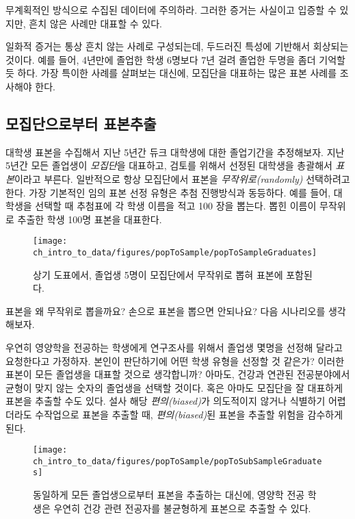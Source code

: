 \begin{termBox}{
무계획적인 방식으로 수집된 데이터에 주의하라. 그러한 증거는 사실이고 입증할 수 있지만, 흔치 않은 사례만 대표할 수 있다.}
\end{termBox}

일화적 증거는 통상 흔치 않는 사례로 구성되는데, 두드러진 특성에 기반해서 회상되는 것이다.
예를 들어, 4년만에 졸업한 학생 6명보다 7년 걸려 졸업한 두명을 좀더 기억할 듯 하다.
가장 특이한 사례를 살펴보는 대신에, 모집단을 대표하는 많은 표본 사례를 조사해야 한다.

\subsection{모집단으로부터 표본추출}


대학생 표본을 수집해서 지난 5년간 듀크 대학생에 대한 졸업기간을 추정해보자.
지난 5년간 모든 졸업생이 \emph{모집단}을 대표하고, 검토를 위해서 선정된 대학생을
총괄해서 \emph{표본}이라고 부른다.
일반적으로 항상 모집단에서 표본을 \emph{무작위로(randomly)} 선택하려고 한다.
가장 기본적인 임의 표본 선정 유형은 추첨 진행방식과 동등하다.
예를 들어, 대학생을 선택할 때 추첨표에 각 학생 이름을 적고 100 장을 뽑는다.
뽑힌 이름이 무작위로 추출한 학생 100명 표본을 대표한다.

\begin{figure}[ht]
\centering
\texttt{[image: ch\_intro\_to\_data/figures/popToSample/popToSampleGraduates]}
\caption{상기 도표에서, 졸업생 5명이 모집단에서 무작위로 뽑혀 표본에 포함된다.}
\label{popToSampleGraduates}
\end{figure}

표본을 왜 무작위로 뽑을까요? 손으로 표본을 뽑으면 안되나요? 다음 시나리오를 생각해보자.

\begin{example}{우연히 영양학을 전공하는 학생에게 연구조사를 위해서 졸업생 몇명을 선정해 달라고 요청한다고 가정하자.
본인이 판단하기에 어떤 학생 유형을 선정할 것 같은가? 이러한 표본이 모든 졸업생을 대표할 것으로 생각합니까?}
아마도, 건강과 연관된 전공분야에서 균형이 맞지 않는 숫자의 졸업생을 선택할 것이다.
혹은 아마도 모집단을 잘 대표하게 표본을 추출할 수도 있다.
설사 해당 \emph{편의(biased)}가 의도적이지 않거나 식별하기 어렵더라도  수작업으로 표본을 추출할 때, \emph{편의(biased)}된 표본을 추출할 위험을 감수하게 된다.
\end{example}

\begin{figure}
\centering
\texttt{[image: ch\_intro\_to\_data/figures/popToSample/popToSubSampleGraduates]}
\caption{동일하게 모든 졸업생으로부터 표본을 추출하는 대신에, 영양학 전공 학생은 우연히 건강 관련 전공자를 불균형하게 표본으로 추출할 수 있다.}
\label{popToSubSampleGraduates}
\end{figure}

